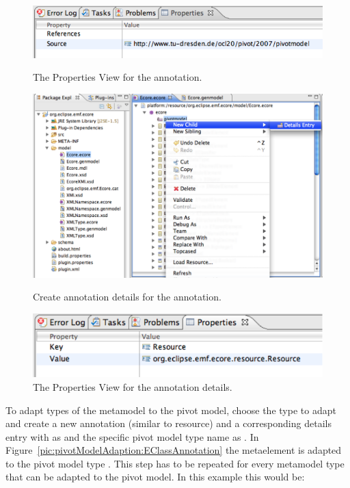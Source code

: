 \begin{figure}[!p]
	\centering
	\includegraphics[width=0.8\linewidth]{figures/pivotModelAdaption/AnnotationProperties}
	\caption{The Properties View for the annotation.}
	\label{pic:pivotModelAdaption:AnnotationProperties}

  \vspace{5.0em}
 
 	\centering
	\includegraphics[width=1.0\linewidth]{figures/pivotModelAdaption/CreateAnnotationDetails}
	\caption{Create annotation details for the annotation.}
	\label{pic:pivotModelAdaption:CreateAnnotationDetails}

  \vspace{5.0em}
 
 	\centering
	\includegraphics[width=0.8\linewidth]{figures/pivotModelAdaption/AnnotationDetailsProperties}
	\caption{The Properties View for the annotation details.}
	\label{pic:pivotModelAdaption:AnnotationDetailsProperties}
\end{figure}

To adapt types of the metamodel to the pivot model, choose the type to adapt
and create a new annotation (similar to resource) and a corresponding details 
entry with  as  and the specific pivot model type
name as . In Figure~\ref{pic:pivotModelAdaption:EClassAnnotation}
the metaelement  is adapted to the pivot model type .
This step has to be repeated for every metamodel type that can be adapted to
the pivot model. In this example this would be:


